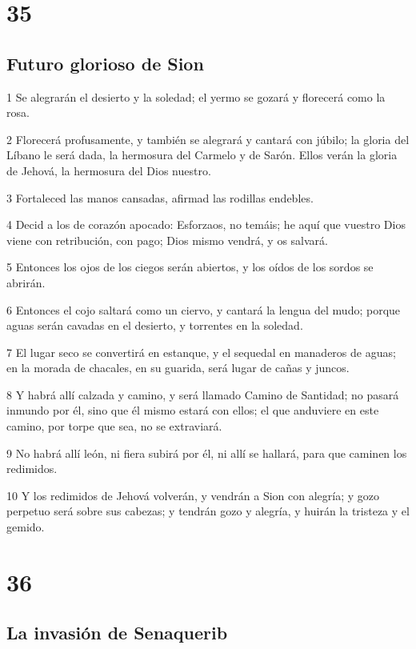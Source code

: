 \chapter{35}

\section*{Futuro glorioso de Sion}

\par 1 Se alegrarán el desierto y la soledad; el yermo se gozará y florecerá como la rosa.
\par 2 Florecerá profusamente, y también se alegrará y cantará con júbilo; la gloria del Líbano le será dada, la hermosura del Carmelo y de Sarón. Ellos verán la gloria de Jehová, la hermosura del Dios nuestro.
\par 3 Fortaleced las manos cansadas, afirmad las rodillas endebles. 
\par 4 Decid a los de corazón apocado: Esforzaos, no temáis; he aquí que vuestro Dios viene con retribución, con pago; Dios mismo vendrá, y os salvará.
\par 5 Entonces los ojos de los ciegos serán abiertos, y los oídos de los sordos se abrirán.
\par 6 Entonces el cojo saltará como un ciervo, y cantará la lengua del mudo; porque aguas serán cavadas en el desierto, y torrentes en la soledad.
\par 7 El lugar seco se convertirá en estanque, y el sequedal en manaderos de aguas; en la morada de chacales, en su guarida, será lugar de cañas y juncos.
\par 8 Y habrá allí calzada y camino, y será llamado Camino de Santidad; no pasará inmundo por él, sino que él mismo estará con ellos; el que anduviere en este camino, por torpe que sea, no se extraviará.
\par 9 No habrá allí león, ni fiera subirá por él, ni allí se hallará, para que caminen los redimidos.
\par 10 Y los redimidos de Jehová volverán, y vendrán a Sion con alegría; y gozo perpetuo será sobre sus cabezas; y tendrán gozo y alegría, y huirán la tristeza y el gemido. 

\chapter{36}

\section*{La invasión de Senaquerib}

